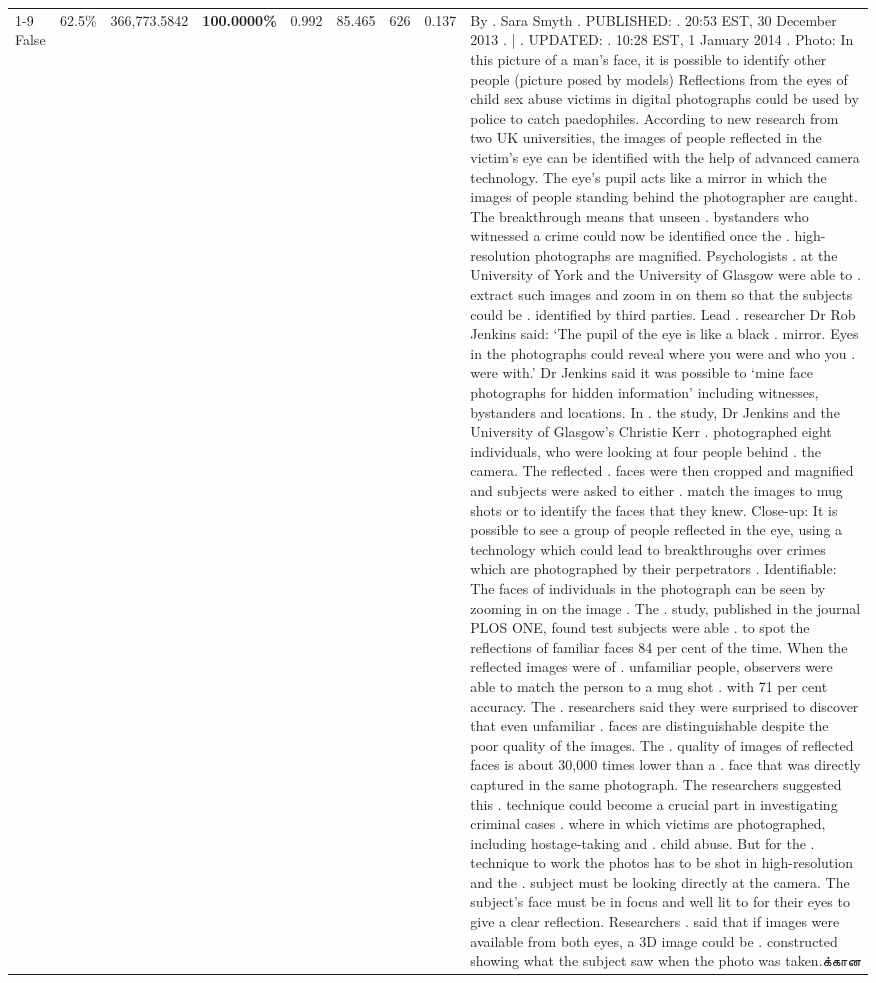 \begin{table}[H]
\begin{tabular}{lllrlllll}
\cline{1-9} \cline{2-9}
False & 62.5\% & 366,773.5842 & \bfseries \color{red} 100.0000\% & 0.992 & 85.465 & 626 & 0.137 & By . Sara Smyth . PUBLISHED: . 20:53 EST, 30 December 2013 . | . UPDATED: . 10:28 EST, 1 January 2014 . Photo: In this picture of a man's face, it is possible to identify other people (picture posed by models) Reflections from the eyes of child sex abuse victims in digital photographs could be used by police to catch paedophiles. According to new research from two UK universities, the images of people reflected in the victim's eye can be identified with the help of advanced camera technology. The eye's pupil acts like a mirror in which the images of people standing behind the photographer are caught. The breakthrough means that unseen . bystanders who witnessed a crime could now be identified once the . high-resolution photographs are magnified. Psychologists . at the University of York and the University of Glasgow were able to . extract such images and zoom in on them so that the subjects could be . identified by third parties. Lead . researcher Dr Rob Jenkins said: ‘The pupil of the eye is like a black . mirror. Eyes in the photographs could reveal where you were and who you . were with.' Dr Jenkins said it was possible to ‘mine face photographs for hidden information' including witnesses, bystanders and locations. In . the study, Dr Jenkins and the University of Glasgow's Christie Kerr . photographed eight individuals, who were looking at four people behind . the camera. The reflected . faces were then cropped and magnified and subjects were asked to either . match the images to mug shots or to identify the faces that they knew. Close-up: It is possible to see a group of people reflected in the eye, using a technology which could lead to breakthroughs over crimes which are photographed by their perpetrators . Identifiable: The faces of individuals in the photograph can be seen by zooming in on the image . The . study, published in the journal PLOS ONE, found test subjects were able . to spot the reflections of familiar faces 84 per cent of the time. When the reflected images were of . unfamiliar people, observers were able to match the person to a mug shot . with 71 per cent accuracy. The . researchers said they were surprised to discover that even unfamiliar . faces are distinguishable despite the poor quality of the images. The . quality of images of reflected faces is about 30,000 times lower than a . face that was directly captured in the same photograph. The researchers suggested this . technique could become a crucial part in investigating criminal cases . where in which victims are photographed, including hostage-taking and . child abuse. But for the . technique to work the photos has to be shot in high-resolution and the . subject must be looking directly at the camera. The subject's face must be in focus and well lit to for their eyes to give a clear reflection. Researchers . said that if images were available from both eyes, a 3D image could be . constructed showing what the subject saw when the photo was taken.க்கான \\

\end{tabular}
\end{table}
